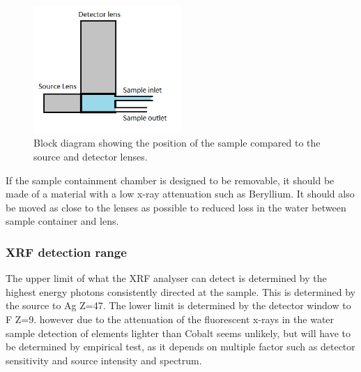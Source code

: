 \begin{figure}[htb]
	\centering
	\includegraphics[width=0.5\textwidth]{figures/XRF/SampleDiagram.png}
	\caption{Block diagram showing the position of the sample compared to the source and detector lenses.}
	\label{fig:XRFSampleDiagram}
\end{figure}

If the sample containment chamber is designed to be removable, it should be made of a material with a low x-ray attenuation such as Beryllium. It should also be moved as close to the lenses as possible to reduced loss in the water between sample container and lens.

\subsubsection{XRF detection range}
The upper limit of what the XRF analyser can detect is determined by the highest energy photons consistently directed at the sample. This is determined by the source to Ag Z=47.
The lower limit is determined by the detector window to F Z=9. however due to the attenuation of the fluorescent x-rays in the water sample detection of elements lighter than Cobalt seems unlikely, but will have to be determined by empirical test, as it depends on multiple factor such as detector sensitivity and source intensity and spectrum.




